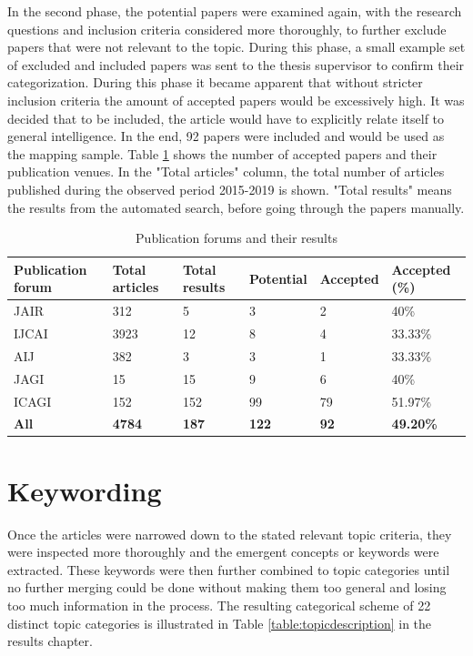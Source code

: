 In the second phase, the potential papers were examined again, with the research
questions and inclusion criteria considered more thoroughly, to further exclude
papers that were not relevant to the topic. During this phase, a small example
set of excluded and included papers was sent to the thesis supervisor to confirm
their categorization. During this phase it became apparent that without stricter
inclusion criteria the amount of accepted papers would be excessively high. It
was decided that to be included, the article would have to explicitly relate
itself to general intelligence. In the end, 92 papers were included and would be
used as the mapping sample. Table \ref*{table:forumtable} shows the number of
accepted papers and their publication venues. In the "Total articles" column,
the total number of articles published during the observed period 2015-2019 is
shown. "Total results" means the results from the automated search, before going
through the papers manually.

  \begin{table}[H]
    \footnotesize
    \centering
    \begin{tabular}{|l|l|l|l|l|l|}
      \hline
      \textbf{Publication forum}  & \textbf{Total articles} & \textbf{Total results} & \textbf{Potential} & \textbf{Accepted} & \textbf{Accepted (\%)} \\ \hline
      JAIR   & 312 & 5   & 3  & 2  & 40\%  \\ \hline
      IJCAI  & 3923 & 12  & 8  & 4  & 33.33\%  \\ \hline
      AIJ    & 382 & 3   & 3  & 1   & 33.33\%  \\ \hline
      JAGI   & 15 & 15  & 9  & 6   & 40\%  \\ \hline
      ICAGI  & 152 & 152 & 99 & 79  & 51.97\%  \\ \hline
      \textbf{All} & \textbf{4784} & \textbf{187} & \textbf{122}  & \textbf{92}  & \textbf{49.20\%}  \\ \hline
    \end{tabular}
    \caption{Publication forums and their results}
    \label{table:forumtable}
  \end{table}

\section{Keywording}
Once the articles were narrowed down to the stated relevant topic criteria,
they were inspected more thoroughly and the emergent concepts or keywords were
extracted. These keywords were then further combined to topic categories until
no further merging could be done without making them too general and losing too
much information in the process. The resulting categorical scheme of 22 distinct
topic categories is illustrated in Table \ref{table:topicdescription} in the
results chapter.  

